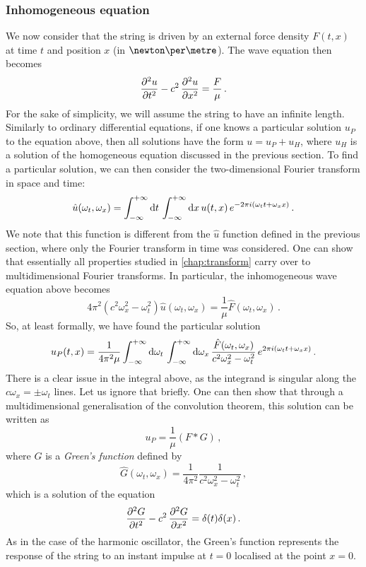 \subsubsection{Inhomogeneous equation}
We now consider that the string is driven by an external force density $F(t,x)$ at time
$t$ and position $x$ (in $\newton\per\metre$). The wave equation then becomes
\begin{equation}
  \frac{\partial^{2} u}{\partial t^{2}}-c^2\,\frac{\partial^{2} u}{\partial x^{2}}=\frac{F}{\mu}\,.
\end{equation}
For the sake of simplicity, we will assume the string to have an infinite length.
Similarly to ordinary differential equations, if one knows a particular solution $u_P$ to
the equation above, then all solutions have the form $u=u_P+u_H$, where $u_H$ is a
solution of the homogeneous equation discussed in the previous section. To find a
particular solution, we can then consider the two-dimensional Fourier transform in space
and time:
\begin{equation}
  \hat{u}(\omega_t,\omega_x)=\int_{-\infty}^{+\infty}\mathrm{d}{t}\,\int_{-\infty}^{+\infty}\mathrm{d}{x}\,
  u(t,x)\,e^{-2\pi i (\omega_tt+\omega_xx)}\,.
\end{equation}
We note that this function is different from the $\hat{u}$ function defined in the
previous section, where only the Fourier transform in time was considered. One can show
that essentially all properties studied in \cref{chap:transform} carry over to
multidimensional Fourier transforms. In particular, the inhomogeneous wave equation above
becomes
\begin{equation}
  4\pi^2(c^2\omega_x^2-\omega_t^2)\hat{u}(\omega_t,\omega_x)=\frac{1}{\mu}\hat{F}(\omega_t,\omega_x)\,.
\end{equation}
So, at least formally, we have found the particular solution
\begin{equation}
  u_P(t,x)=\frac{1}{4\pi^2\mu}\int_{-\infty}^{+\infty}\mathrm{d}{\omega_t}\,\int_{-\infty}^{+\infty}\mathrm{d}{\omega_x}\,
  \frac{\hat{F}(\omega_t,\omega_x)}{c^2\omega_x^2-\omega_t^2}
  \,e^{2\pi i (\omega_tt+\omega_xx)}\,.\label{eq:wave-eq-up}
\end{equation}
There is a clear issue in the integral above, as the integrand is singular along the
$c\omega_x=\pm\omega_t$ lines. Let us ignore that briefly. One can then show that through
a multidimensional generalisation of the convolution theorem, this solution can be written
as
\begin{equation}
  u_P=\frac{1}{\mu}(F\ast G)\,,
\end{equation}
where $G$ is a \emph{Green's function} defined by
\begin{equation}
  \hat{G}(\omega_t,\omega_x)=\frac{1}{4\pi^2}\frac{1}{c^2\omega_x^2-\omega_t^2}\,,
\end{equation}
which is a solution of the equation
\begin{equation}
  \frac{\partial^{2} G}{\partial t^{2}}-c^2\,\frac{\partial^{2} G}{\partial x^{2}}=\delta(t)\delta(x)\,.
\end{equation}
As in the case of the harmonic oscillator, the Green's function represents the response of
the string to an instant impulse at $t=0$ localised at the point $x=0$.

